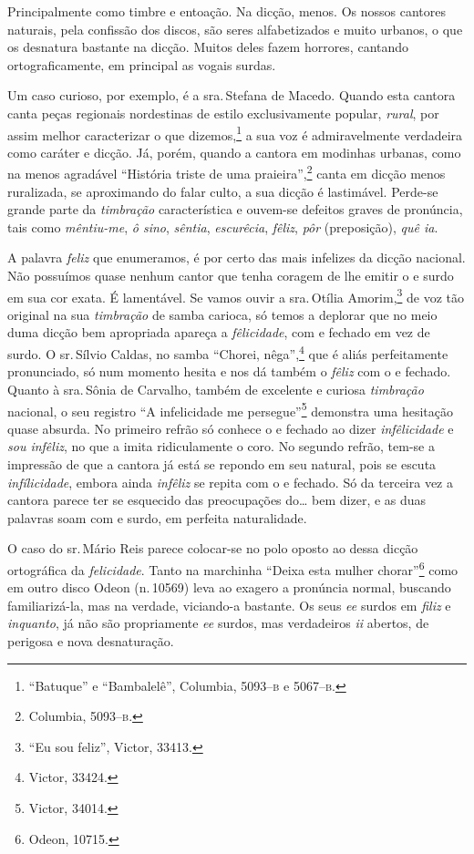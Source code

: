 Principalmente como timbre e entoação. Na dicção, menos. Os nossos
cantores naturais, pela confissão dos discos, são seres alfabetizados e
muito urbanos, o que os desnatura bastante na dicção. Muitos deles fazem
horrores, cantando ortograficamente, em principal as vogais surdas.

Um caso curioso, por exemplo, é a sra.\,Stefana de Macedo. Quando esta
cantora canta peças regionais nordestinas de estilo exclusivamente
popular, \textit{rural}, por assim melhor caracterizar o que dizemos,\footnote{``Batuque'' e ``Bambalelê'', Columbia, 5093--\textsc{b} e 5067--\textsc{b}.} a sua voz é
admiravelmente verdadeira como caráter e dicção. Já, porém, quando a
cantora em modinhas urbanas, como na menos agradável ``História triste
de uma praieira'',\footnote{Columbia, 5093--\textsc{b}.} canta em dicção menos ruralizada,
se aproximando do falar culto, a sua dicção é lastimável. Perde-se
grande parte da \textit{timbração} característica e ouvem-se defeitos graves de
pronúncia, tais como \textit{mêntiu-me}, \textit{ô sino}, \textit{sêntia},
\textit{escurêcia}, \textit{fêliz}, \textit{pôr} (preposição), \textit{quê ia}.

A palavra \textit{feliz} que enumeramos, é por certo das mais infelizes da
dicção nacional. Não possuímos quase nenhum cantor que tenha coragem de
lhe emitir o e surdo em sua cor exata. É lamentável. Se vamos ouvir a
sra.\,Otília Amorim,\footnote{``Eu sou feliz'', Victor, 33413.} de voz tão original na
sua \textit{timbração} de samba carioca, só temos a deplorar que no meio duma
dicção bem apropriada apareça a \textit{fêlicidade}, com e fechado em vez de
surdo. O sr.\,Sílvio Caldas, no samba ``Chorei, nêga'',\footnote{Victor, 33424.}
que é aliás perfeitamente pronunciado, só num momento hesita e nos dá
também o \textit{fêliz} com o e fechado. Quanto à sra.\,Sônia de Carvalho,
também de excelente e curiosa \textit{timbração} nacional, o seu registro ``A
infelicidade me persegue''\footnote{Victor, 34014.} demonstra uma hesitação quase
absurda. No primeiro refrão só conhece o e fechado ao dizer
\textit{infêlicidade} e \textit{sou infêliz}, no que a imita ridiculamente o coro.
No segundo refrão, tem-se a impressão de que a cantora já está se
repondo em seu natural, pois se escuta \textit{infílicidade}, embora ainda
\textit{infêliz} se repita com o e fechado. Só da terceira vez a cantora
parece ter se esquecido das preocupações do\ldots{} bem dizer, e as duas
palavras soam com e surdo, em perfeita naturalidade.

O caso do sr.\,Mário Reis parece colocar-se no polo oposto ao dessa
dicção ortográfica da \textit{felicidade}. Tanto na marchinha ``Deixa esta
mulher chorar''\footnote{Odeon, 10715.} como em outro disco Odeon (n.\,10569) leva
ao exagero a pronúncia normal, buscando familiarizá-la, mas na verdade,
viciando-a bastante. Os seus \textit{ee} surdos em \textit{filiz} e \textit{inquanto}, já
não são propriamente \textit{ee} surdos, mas verdadeiros \textit{ii} abertos, de perigosa
e nova desnaturação.

